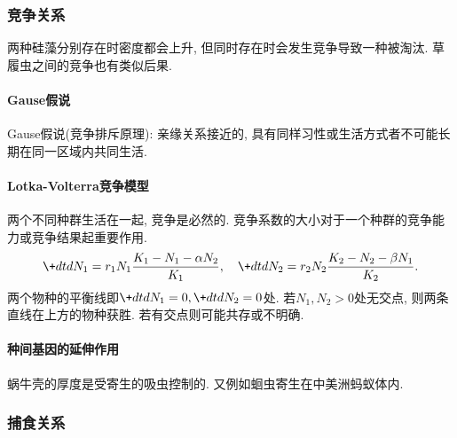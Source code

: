 \documentclass{ctexart}
\begin{document}
\subsubsection{竞争关系} %
\label{ssub:竞争关系}

两种硅藻分别存在时密度都会上升, 但同时存在时会发生竞争导致一种被淘汰. 草履虫之间的竞争也有类似后果.
\paragraph{Gause假说} %
\label{par:gause假说}

Gause假说(竞争排斥原理): 亲缘关系接近的, 具有同样习性或生活方式者不可能长期在同一区域内共同生活.


\paragraph{Lotka-Volterra竞争模型} %
\label{par:lotka_volterra竞争模型}

两个不同种群生活在一起, 竞争是必然的. 竞争系数的大小对于一个种群的竞争能力或竞争结果起重要作用.
\[ \+dtd{N_1} = r_1N_1\frac{K_1-N_1-\alpha N_2}{K_1},\quad \+dtd{N_2} = r_2N_2 \frac{K_2 - N_2 - \beta N_1}{K_2}. \]
两个物种的平衡线即$\displaystyle \+dtd{N_1} =0, \+dtd{N_2} = 0$处. 若$N_1,N_2>0$处无交点, 则两条直线在上方的物种获胜. 若有交点则可能共存或不明确.


\paragraph{种间基因的延伸作用} %
\label{par:种间基因的延伸作用}

蜗牛壳的厚度是受寄生的吸虫控制的. 又例如蛔虫寄生在中美洲蚂蚁体内.



\subsubsection{捕食关系} %
\label{ssub:捕食关系}
\end{document}
